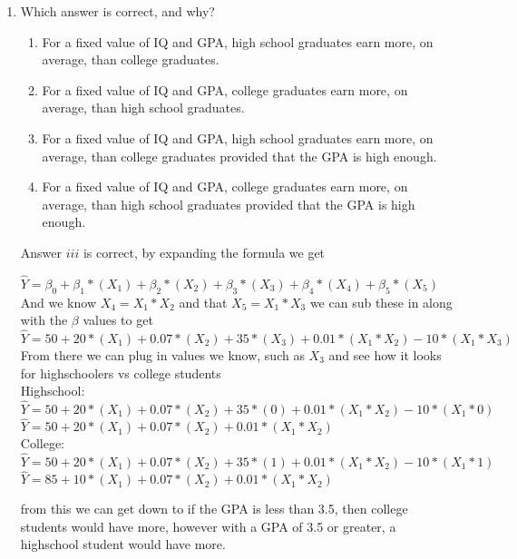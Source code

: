 \documentclass[12pt]{article}
\begin{document}
\begin{enumerate}
    \item Which answer is correct, and why?
          \begin{enumerate}[label=(\roman*)]
              \item For a fixed value of IQ and GPA, high school graduates earn more, on average, than college graduates.
              \item For a fixed value of IQ and GPA, college graduates earn more, on average, than high school graduates.
              \item For a fixed value of IQ and GPA, high school graduates earn more, on average, than college graduates provided that the GPA is high enough.
              \item For a fixed value of IQ and GPA, college graduates earn more, on average, than high school graduates provided that the GPA is high enough.
          \end{enumerate}
          Answer $iii$ is correct, by expanding the formula we get
          \begin{center}
              $\hat{Y} = \beta_0 + \beta_1 * (X_1) +\beta_2 * (X_2) +\beta_3 * (X_3) +\beta_4 * (X_4) +\beta_5 * (X_5)$
              \\And we know $X_4 = X_1 * X_2$ and that $X_5 = X_1 * X_3$ we can sub these in along with the $\beta$ values to get\\
              $\hat{Y} = 50 + 20 * (X_1) + 0.07 * (X_2) + 35 * (X_3) + 0.01 * (X_1 * X_2) -10 * (X_1 * X_3)$
              \\From there we can plug in values we know, such as $X_3$ and see how it looks for highschoolers vs college students\\
              Highschool:\\
              $\hat{Y} = 50 + 20 * (X_1) + 0.07 * (X_2) + 35 * (0) + 0.01 * (X_1 * X_2) -10 * (X_1 * 0)$\\
              $\hat{Y} = 50 + 20 * (X_1) + 0.07 * (X_2) + 0.01 * (X_1 * X_2)$
              \\College:\\
              $\hat{Y} = 50 + 20 * (X_1) + 0.07 * (X_2) + 35 * (1) + 0.01 * (X_1 * X_2) -10 * (X_1 * 1)$\\
              $\hat{Y} = 85 + 10 * (X_1) + 0.07 * (X_2) + 0.01 * (X_1 * X_2)$
          \end{center}
          from this we can get down to if the GPA is less than 3.5, then college students would have more, however with a GPA of 3.5 or greater, a highschool student would have more.

\end{enumerate}
\end{document}
